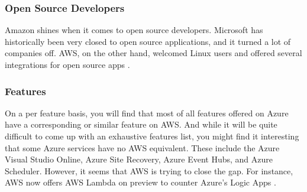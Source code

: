 \subsubsection{Open Source Developers}
Amazon shines when it comes to open source developers.  Microsoft has historically been very closed to open source applications, and it turned a lot of companies off.  AWS, on the other hand, welcomed Linux users and offered several integrations for open source apps \cite{stackify}.

\subsubsection{Features}
On a per feature basis, you will find that most of all features offered on Azure have a corresponding or similar feature on AWS.  And while it will be quite difficult to come up with an exhaustive features list, you might find it interesting that some Azure services have no AWS equivalent. These include the Azure Visual Studio Online, Azure Site Recovery, Azure Event Hubs, and Azure Scheduler.  However, it seems that AWS is trying to close the gap.  For instance, AWS now offers AWS Lambda on preview to counter Azure’s Logic Apps \cite{stackify}.